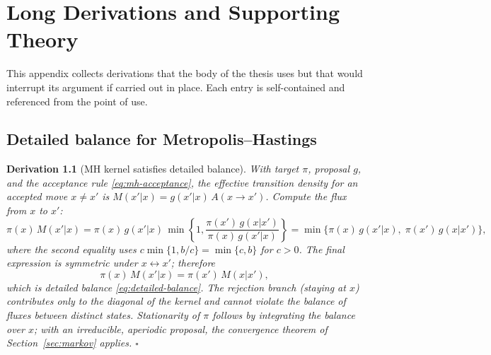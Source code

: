\chapter{Long Derivations and Supporting Theory}\label{app:derivations}

This appendix collects derivations that the body of the thesis uses but that
would interrupt its argument if carried out in place. Each entry is
self-contained and referenced from the point of use.

\newtheorem{derivation}{Derivation}[chapter]

\section{Detailed balance for Metropolis--Hastings}

\begin{derivation}[MH kernel satisfies detailed balance]\label{drv:mh}
With target $\pi$, proposal $g$, and the acceptance rule
\eqref{eq:mh-acceptance}, the effective transition density for an accepted
move $x \neq x'$ is $M(x'|x) = g(x'|x)\, A(x \to x')$. Compute the flux from
$x$ to $x'$:
\begin{equation*}
  \pi(x)\, M(x'|x)
  = \pi(x)\, g(x'|x)\, \min\!\left\{ 1,
    \frac{\pi(x')\, g(x|x')}{\pi(x)\, g(x'|x)} \right\}
  = \min\Big\{ \pi(x)\, g(x'|x),\; \pi(x')\, g(x|x') \Big\},
\end{equation*}
where the second equality uses $c \min\{1, b/c\} = \min\{c, b\}$ for
$c > 0$. The final expression is \emph{symmetric} under
$x \leftrightarrow x'$; therefore
\begin{equation*}
  \pi(x)\, M(x'|x) = \pi(x')\, M(x|x') ,
\end{equation*}
which is detailed balance \eqref{eq:detailed-balance}. The rejection branch
(staying at $x$) contributes only to the diagonal of the kernel and cannot
violate the balance of fluxes between distinct states. Stationarity of
$\pi$ follows by integrating the balance over $x$; with an irreducible,
aperiodic proposal, the convergence theorem of
Section~\ref{sec:markov} applies. \hfill$\square$
\end{derivation}
